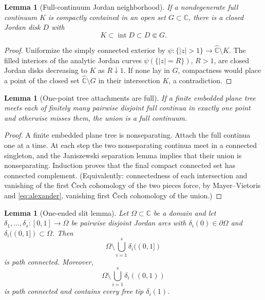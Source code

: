 \documentclass[11pt,reqno]{amsart}
\numberwithin{equation}{section}
\theoremstyle{plain}
\newtheorem{lemma}[theorem]{Lemma}
\theoremstyle{definition}
\theoremstyle{remark}
\newcommand{\Chat}{\widehat{\mathbb C}}
\newcommand{\C}{\mathbb C}
\begin{document}
\begin{lemma}[Full-continuum Jordan neighborhood]
\label{lem:full-jordan-neighborhood}
If a nondegenerate full continuum $K$ is compactly contained in an open
set $G\subset\C$, there is a closed Jordan disk $D$ with
\begin{equation}
 K\subset\operatorname{int}D\subset D\Subset G.
\label{eq:jordan-nbhd}
\end{equation}
\end{lemma}

\begin{proof}
Uniformize the simply connected exterior by
$\psi\colon\{|z|>1\}\to\Chat\setminus K$.  The filled interiors of the
analytic Jordan curves $\psi(\{|z|=R\})$, $R>1$, are closed Jordan disks
decreasing to $K$ as $R\downarrow1$.  If none lay in $G$, compactness
would place a point of the closed set $\Chat\setminus G$ in their
intersection $K$, a contradiction.
\end{proof}

\begin{lemma}[One-point tree attachments are full]
\label{lem:tree-attachment-full}
If a finite embedded plane tree meets each of finitely many pairwise
disjoint full continua in exactly one point and otherwise misses them,
the union is a full continuum.
\end{lemma}

\begin{proof}
A finite embedded plane tree is nonseparating.  Attach the full continua
one at a time.  At each step the two nonseparating continua meet in a
connected singleton, and the Janiszewski separation lemma implies that
their union is nonseparating.  Induction proves that the final compact
connected set has connected complement.  (Equivalently: connectedness of
each intersection and vanishing of the first \v Cech cohomology of the
two pieces force, by Mayer--Vietoris and \eqref{eq:alexander}, vanishing
first \v Cech cohomology of the union.)
\end{proof}

\begin{lemma}[One-ended slit lemma]
\label{lem:one-ended-slits}
Let $\Omega\subset\C$ be a domain and let
$\delta_1,\ldots,\delta_s\colon[0,1]\to\overline\Omega$ be pairwise
disjoint Jordan arcs with $\delta_i(0)\in\partial\Omega$ and
$\delta_i((0,1])\subset\Omega$.  Then
\[
 \Omega\setminus\bigcup_{i=1}^s\delta_i((0,1])
\]
is path connected.  Moreover,
\[
 \Omega\setminus\bigcup_{i=1}^s\delta_i((0,1))
\]
is path connected and contains every free tip $\delta_i(1)$.
\end{lemma}
\end{document}
